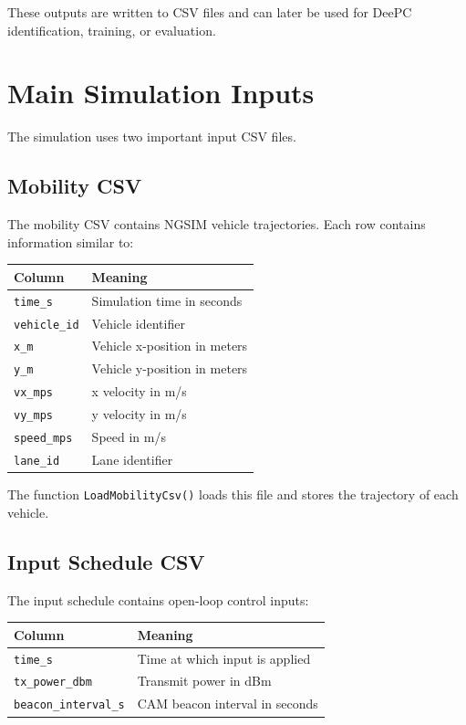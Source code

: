\documentclass[11pt,a4paper]{article}
\begin{document}
These outputs are written to CSV files and can later be used for DeePC identification, training, or evaluation.

\section{Main Simulation Inputs}

The simulation uses two important input CSV files.

\subsection{Mobility CSV}

The mobility CSV contains NGSIM vehicle trajectories. Each row contains information similar to:

\begin{center}
\begin{tabular}{ll}
\toprule
Column & Meaning \\
\midrule
\texttt{time\_s} & Simulation time in seconds \\
\texttt{vehicle\_id} & Vehicle identifier \\
\texttt{x\_m} & Vehicle x-position in meters \\
\texttt{y\_m} & Vehicle y-position in meters \\
\texttt{vx\_mps} & x velocity in m/s \\
\texttt{vy\_mps} & y velocity in m/s \\
\texttt{speed\_mps} & Speed in m/s \\
\texttt{lane\_id} & Lane identifier \\
\bottomrule
\end{tabular}
\end{center}

The function \texttt{LoadMobilityCsv()} loads this file and stores the trajectory of each vehicle.

\subsection{Input Schedule CSV}

The input schedule contains open-loop control inputs:

\begin{center}
\begin{tabular}{ll}
\toprule
Column & Meaning \\
\midrule
\texttt{time\_s} & Time at which input is applied \\
\texttt{tx\_power\_dbm} & Transmit power in dBm \\
\texttt{beacon\_interval\_s} & CAM beacon interval in seconds \\
\bottomrule
\end{tabular}
\end{center}
\end{document}

